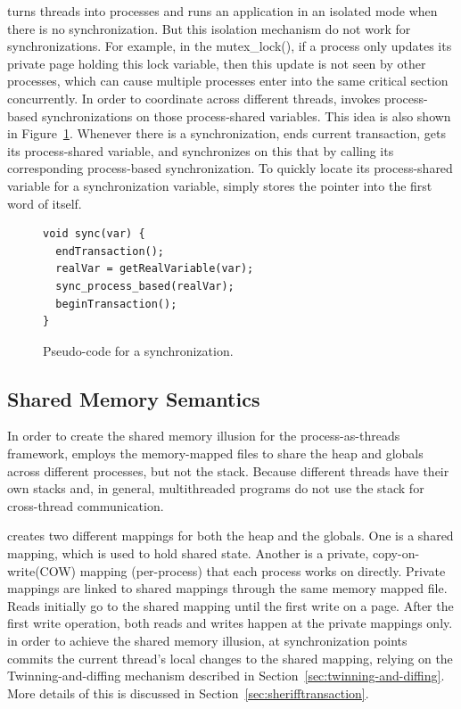 \sheriff{} turns threads into processes and runs an application in an isolated mode when there is no synchronization. But this isolation mechanism do not work for synchronizations. For example, in the mutex\_lock(), if a process only updates its private page holding this lock variable, then this update is not seen by other processes, which can cause multiple processes enter into the same critical section concurrently. In order to coordinate across different threads, \sheriff{} invokes process-based synchronizations on those process-shared variables. This idea is also shown in Figure~\ref{fig:synccode}. Whenever there is a synchronization, \sheriff{} ends current transaction, gets its process-shared variable, and synchronizes on this that by calling its corresponding process-based synchronization. To quickly locate its process-shared variable for a synchronization variable, \sheriff{} simply stores the pointer into the first word of itself. 
 
\begin{figure}[!t]
\small
\begin{lstlisting}[style=tt]
void sync(var) {
  endTransaction();
  realVar = getRealVariable(var);
  sync_process_based(realVar);	
  beginTransaction();
}
\end{lstlisting}
\caption{Pseudo-code for a synchronization.\label{fig:synccode}}
\end{figure}

\subsection{Shared Memory Semantics}

In order to create the shared memory illusion for the process-as-threads framework, \sheriff{} employs the memory-mapped files to share the heap and globals across different processes, but not the stack. Because different threads
have their own stacks and, in general, multithreaded programs
do not use the stack for cross-thread communication.

\sheriff{} creates two different mappings for both the heap and the globals. One is a shared mapping, which is used to hold shared state. Another is a private, copy-on-write(COW) mapping (per-process) that each process works on directly.
Private mappings are linked to shared mappings through the same memory mapped file. Reads initially go to the shared mapping until the first write on a page. After the first write operation, both reads and writes happen at the private mappings only. in order to achieve the shared memory illusion, at synchronization points \sheriff{} commits the current thread's local changes to the shared mapping, relying on the Twinning-and-diffing mechanism described in Section~\ref{sec:twinning-and-diffing}. More details of this is discussed in Section~\ref{sec:sherifftransaction}.

